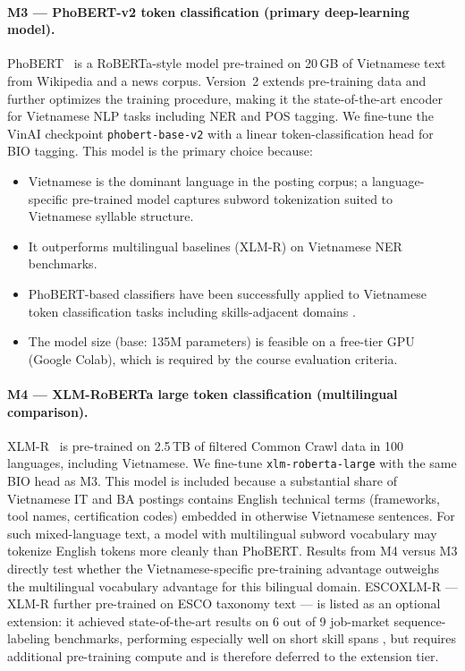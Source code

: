 \documentclass[12pt,a4paper]{article}
\begin{document}
\paragraph{M3 — PhoBERT-v2 token classification (primary deep-learning model).}
PhoBERT~\cite{phobert} is a RoBERTa-style model pre-trained on 20\,GB of
Vietnamese text from Wikipedia and a news corpus. Version~2 extends
pre-training data and further optimizes the training procedure, making it
the state-of-the-art encoder for Vietnamese NLP tasks including NER and
POS tagging. We fine-tune the VinAI checkpoint
\texttt{phobert-base-v2} with a linear token-classification head for BIO
tagging. This model is the primary choice
because:
\begin{itemize}
  \item Vietnamese is the dominant language in the posting corpus; a
        language-specific pre-trained model captures subword tokenization
        suited to Vietnamese syllable structure.
  \item It outperforms multilingual baselines (XLM-R) on Vietnamese NER
        benchmarks.
  \item PhoBERT-based classifiers have been successfully applied to
        Vietnamese token classification tasks including skills-adjacent
        domains \cite{phobert}.
  \item The model size (base: 135M parameters) is feasible on a
        free-tier GPU (Google Colab), which is required by the course
        evaluation criteria.
\end{itemize}

\paragraph{M4 — XLM-RoBERTa large token classification (multilingual
comparison).}
XLM-R~\cite{xlmr} is pre-trained on 2.5\,TB of filtered Common Crawl
data in 100 languages, including Vietnamese. We fine-tune
\texttt{xlm-roberta-large} with the same BIO head as M3. This model
is included because a substantial share of Vietnamese IT and BA postings
contains English technical terms (frameworks, tool names, certification
codes) embedded in otherwise Vietnamese sentences. For such mixed-language
text, a model with multilingual subword vocabulary may tokenize English
tokens more cleanly than PhoBERT. Results from M4 versus M3 directly test
whether the Vietnamese-specific pre-training advantage outweighs the
multilingual vocabulary advantage for this bilingual domain. ESCOXLM-R
\cite{escoxlmr} — XLM-R further pre-trained on ESCO taxonomy text — is
listed as an optional extension: it achieved state-of-the-art results on
6 out of 9 job-market sequence-labeling benchmarks, performing especially
well on short skill spans \cite{escoxlmr}, but requires additional
pre-training compute and is therefore deferred to the extension tier.
\end{document}
